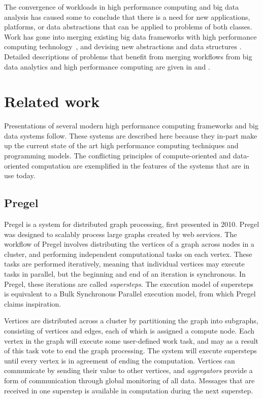 \documentclass{uit-report}
\begin{document}
The convergence of workloads in high performance computing and big data analysis has caused some to conclude that there is a need for new applications, platforms, or data abstractions that can be applied to problems of both classes. Work has gone into merging existing big data frameworks with high performance computing technology~\cite{bridgingthegap}\cite{gittens2016matrix}, and devising new abstractions and data structures \cite{yang2017best}. Detailed descriptions of problems that benefit from merging workflows from big data analytics and high performance computing are given in \cite{subcommittee} and \cite{bigdataconvergence}.

\section{Related work} \label{section:relatedwork}
Presentations of several modern high performance computing frameworks and big data systems follow. These systems are described here because they in-part make up the current state of the art high performance computing techniques and programming models. The conflicting principles of compute-oriented and data-oriented computation are exemplified in the features of the systems that are in use today.

\subsection{Pregel}
Pregel \cite{pregel} is a system for distributed graph processing, first presented in 2010. Pregel was designed to scalably process large graphs created by web services. The workflow of Pregel involves distributing the vertices of a graph across nodes in a cluster, and performing independent computational tasks on each vertex. These tasks are performed iteratively, meaning that individual vertices may execute tasks in parallel, but the beginning and end of an iteration is synchronous. In Pregel, these iterations are called \emph{supersteps}. The execution model of supersteps is equivalent to a Bulk Synchronous Parallel execution model, from which Pregel claims inspiration. 

Vertices are distributed across a cluster by partitioning the graph into subgraphs, consisting of vertices and edges, each of which is assigned a compute node. Each vertex in the graph will execute some user-defined work task, and may as a result of this task vote to end the graph processing. The system will execute supersteps until every vertex is in agreement of ending the computation. Vertices can communicate by sending their value to other vertices, and \emph{aggregators} provide a form of communication through global monitoring of all data. Messages that are received in one superstep is available in computation during the next superstep.
\end{document}

